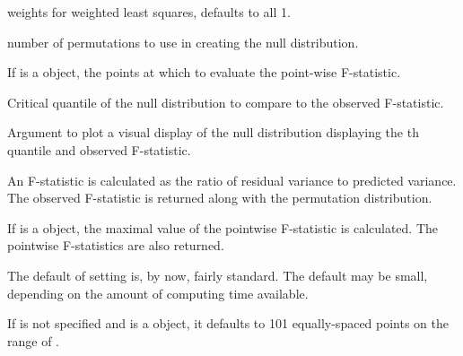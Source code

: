 \documentclass{article}
\begin{document}
\begin{Arguments}
\begin{ldescription}
\item[\code{wt}] weights for weighted least squares, defaults to all 1.

\item[\code{nperm}] number of permutations to use in creating the null distribution.

\item[\code{argvals}] If  is a  object, the points at which to evaluate
the point-wise F-statistic.

\item[\code{q}] Critical quantile of the null distribution to compare to the observed
F-statistic.

\item[\code{plotres}] Argument to plot a visual display of the null distribution displaying the
th quantile and observed F-statistic.

\end{ldescription}
\end{Arguments}
\begin{Details}\relax
An F-statistic is calculated as the ratio of residual variance to predicted
variance. The observed F-statistic is returned along with the permutation
distribution.

If  is a  object, the maximal value of the pointwise
F-statistic is calculated. The pointwise F-statistics are also returned.

The default of setting  is, by now, fairly standard. The default
 may be small, depending on the amount of computing time available.

If  is not specified and  is a  object,
it defaults to 101 equally-spaced points on the range of .
\end{Details}
\end{document}
